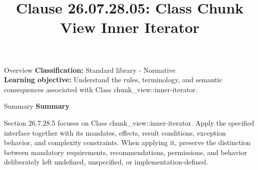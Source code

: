 \documentclass[10pt,letterpaper]{article}
\title{Clause 26.07.28.05: Class Chunk View Inner Iterator}
\author{}
\date{}
\begin{document}
\maketitle
\begin{CornellOverviewBox}{Overview}
\textbf{Classification:} Standard library - Normative\\[2pt]
\textbf{Learning objective:} Understand the rules, terminology, and semantic consequences associated with Class chunk\_view::inner-iterator.
\end{CornellOverviewBox}\begin{CornellSummaryBox}{Summary}
{\sffamily\bfseries\color{Accent} Summary}\par\vspace{3pt}Section 26.7.28.5 focuses on Class chunk\_view::inner-iterator. Apply the specified interface together with its mandates, effects, result conditions, exception behavior, and complexity constraints. When applying it, preserve the distinction between mandatory requirements, recommendations, permissions, and behavior deliberately left undefined, unspecified, or implementation-defined.
\end{CornellSummaryBox}
\end{document}
